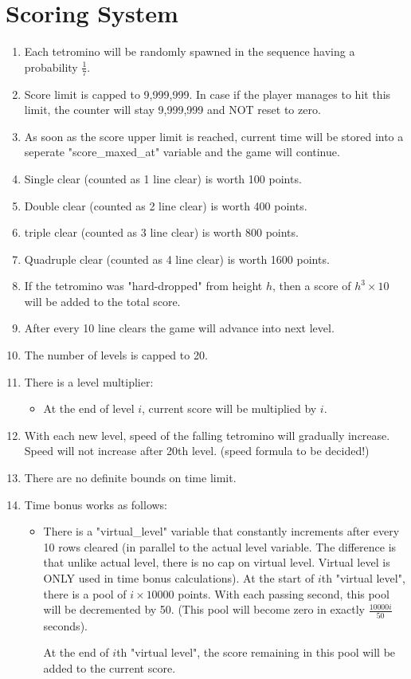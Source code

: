 \documentclass[10pt]{report}
\theoremstyle{definition}
\theoremstyle{remark}
\begin{document}
\section{Scoring System}
\begin{enumerate}
\item Each tetromino will be randomly spawned in the sequence having a probability $\frac{1}{7}.$
\item Score limit is capped to 9,999,999. In case if the player manages to hit this limit, the counter will stay 9,999,999 and NOT reset to zero.
\item As soon as the score upper limit is reached, current time will be stored into a seperate "score\_maxed\_at" variable and the game will continue.
\item Single clear (counted as 1 line clear) is worth 100 points.
\item Double clear (counted as 2 line clear) is worth 400 points.
\item triple clear (counted as 3 line clear) is worth 800 points.
\item Quadruple clear (counted as 4 line clear) is worth 1600 points.
\item If the tetromino was "hard-dropped" from height $h$, then a score of $h^{3}\times10$ will be added to the total score.
\item After every 10 line clears the game will advance into next level.
\item The number of levels is capped to 20.
\item There is a level multiplier:
    \begin{itemize}
    \item At the end of level $i$, current score will be multiplied by $i$.
    \end{itemize}
\item With each new level, speed of the falling tetromino will gradually increase. Speed will not increase after 20th level. (speed formula to be decided!)
\item There are no definite bounds on time limit.
\item Time bonus works as follows:
    \begin{itemize}
    \item There is a "virtual\_level" variable that constantly increments after every 10 rows cleared (in parallel to the actual level variable. The difference is that unlike actual level, there is no cap on virtual level. Virtual level is ONLY used in time bonus calculations). At the start of $i$th "virtual level", there is a pool of $i\times10000$ points. With each passing second, this pool will be decremented by 50. (This pool will become zero in exactly $\frac{10000i}{50}$ seconds).

        At the end of $i$th "virtual level", the score remaining in this pool will be added to the current score.
    \end{itemize}
\end{enumerate}
\end{document}
